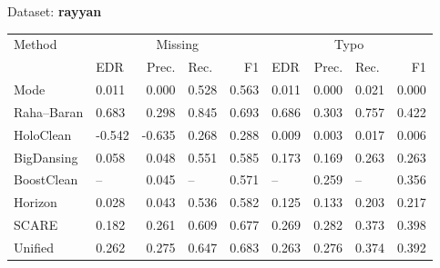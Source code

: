 \begin{subtable}[t]{0.492\linewidth}
\caption{Dataset: \textbf{rayyan}}
\label{tab:q1-acc-rayyan}
\centering
\begin{tabular}{llrlrlrlr}
\toprule
\multirow{2}{*}{Method} &\multicolumn{4}{c}{Missing} &\multicolumn{4}{c}{Typo}\\
\cmidrule(lr){2-5}\cmidrule(l){6-9}
 & EDR & Prec. & Rec. & F1 & EDR & Prec. & Rec. & F1\\
\midrule
\midrule
Mode & 0.011 & 0.000 & 0.528 & 0.563 & 0.011 & 0.000 & 0.021 & 0.000 \\
Raha–Baran & 0.683 & 0.298 & 0.845 & 0.693 & 0.686 & 0.303 & 0.757 & 0.422 \\
HoloClean & -0.542 & -0.635 & 0.268 & 0.288 & 0.009 & 0.003 & 0.017 & 0.006 \\
BigDansing & 0.058 & 0.048 & 0.551 & 0.585 & 0.173 & 0.169 & 0.263 & 0.263 \\
BoostClean & -- & 0.045 & -- & 0.571 & -- & 0.259 & -- & 0.356 \\
Horizon & 0.028 & 0.043 & 0.536 & 0.582 & 0.125 & 0.133 & 0.203 & 0.217 \\
SCARE & 0.182 & 0.261 & 0.609 & 0.677 & 0.269 & 0.282 & 0.373 & 0.398 \\
Unified & 0.262 & 0.275 & 0.647 & 0.683 & 0.263 & 0.276 & 0.374 & 0.392 \\
\bottomrule
\bottomrule
\end{tabular}
\end{subtable}